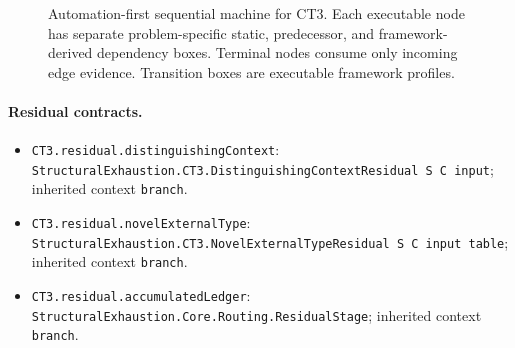 \begin{landscape}
\begin{figure}[p]
\begin{adjustbox}{max totalsize={\linewidth}{0.72\textheight},center}
%
\end{adjustbox}
\caption{Automation-first sequential machine for CT3. Each executable node has separate problem-specific static, predecessor, and framework-derived dependency boxes. Terminal nodes consume only incoming edge evidence. Transition boxes are executable framework profiles.}
\label{fig:ct3-machine}
\end{figure}
\end{landscape}

\begingroup\small\sloppy
\paragraph{Residual contracts.}
\begin{itemize}
\item \texttt{CT3.\allowbreak{}residual.\allowbreak{}distingu\allowbreak{}ishing\allowbreak{}Context}: \texttt{Structural\allowbreak{}Exhaustion.\allowbreak{}CT3.\allowbreak{}Distingui\allowbreak{}shing\allowbreak{}Context\allowbreak{}Residual S C input}; inherited context \texttt{branch}.
\item \texttt{CT3.\allowbreak{}residual.\allowbreak{}novel\allowbreak{}External\allowbreak{}Type}: \texttt{Structural\allowbreak{}Exhaustion.\allowbreak{}CT3.\allowbreak{}Novel\allowbreak{}External\allowbreak{}Type\allowbreak{}Residual S C input table}; inherited context \texttt{branch}.
\item \texttt{CT3.\allowbreak{}residual.\allowbreak{}accumulated\allowbreak{}Ledger}: \texttt{Structural\allowbreak{}Exhaustion.\allowbreak{}Core.\allowbreak{}Routing.\allowbreak{}Residual\allowbreak{}Stage}; inherited context \texttt{branch}.
\end{itemize}
